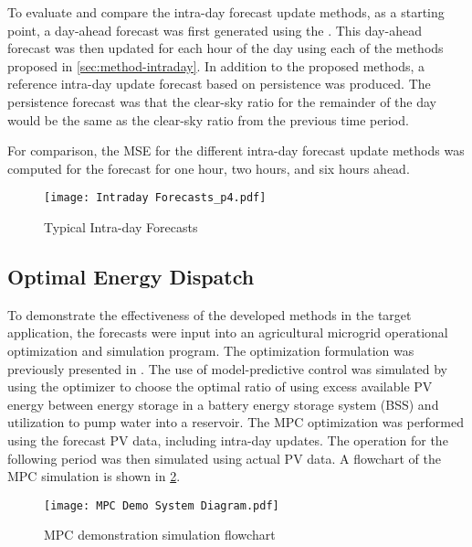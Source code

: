To evaluate and compare the intra-day forecast update methods,
as a starting point, a day-ahead forecast was first generated using the
.
This day-ahead forecast was then updated for each hour of the day using each of the methods proposed in \cref{sec:method-intraday}.
In addition to the proposed methods, a reference intra-day update forecast based on persistence was produced.
The persistence forecast was that the clear-sky ratio for the remainder of the day would be the same as the clear-sky ratio from the previous time period.

For comparison, the MSE for the different intra-day forecast update methods was computed for the forecast for one hour, two hours, and six hours ahead.

\begin{figure}[tbh]
	\centering
	\texttt{[image: Intraday Forecasts\_p4.pdf]}
	\caption{Typical Intra-day Forecasts}
	\label{fig:intraday-forecast}
\end{figure}


\subsection{Optimal Energy Dispatch}

To demonstrate the effectiveness of the developed methods in the target application,
the forecasts were input into an agricultural microgrid operational optimization and simulation program.
The optimization formulation was previously presented in \cite{Brown2022}.
The use of model-predictive control was simulated by using the optimizer to choose the optimal ratio of using excess available PV energy between energy storage in a battery energy storage system (BSS) and utilization to pump water into a reservoir.
The MPC optimization was performed using the forecast PV data, including intra-day updates.
The operation for the following period was then simulated using actual PV data.
A flowchart of the MPC simulation is shown in \cref{fig:mpc-simulation-flowchart}.

\begin{figure}[tbh]
	\centering
	\texttt{[image: MPC Demo System Diagram.pdf]}
	\caption{MPC demonstration simulation flowchart}
	\label{fig:mpc-simulation-flowchart}
\end{figure}

